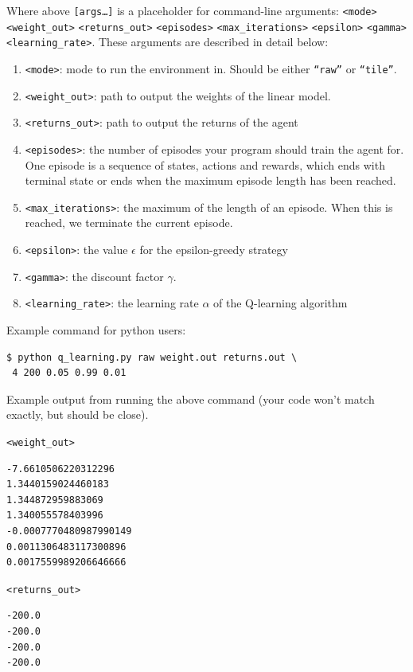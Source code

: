 \documentclass[11pt]{article}
\numberwithin{equation}{section} %
\numberwithin{figure}{section} %
\numberwithin{table}{section} %
\begin{document}
Where above \texttt{[args\dots]} is a placeholder for command-line arguments: \texttt{<mode>} \texttt{<weight\_out>} \texttt{<returns\_out>} \texttt{<episodes>} \texttt{<max\_iterations>} \texttt{<epsilon>} \texttt{<gamma>} \texttt{<learning\_rate>}. These arguments are described in detail below:
\begin{enumerate}
    \item \texttt{<mode>}: mode to run the environment in. Should be either \texttt{``raw''} or \texttt{``tile''}.
    \item \texttt{<weight\_out>}: path to output the weights of the linear model.
    \item \texttt{<returns\_out>}: path to output the returns of the agent
    \item \texttt{<episodes>}: the number of episodes your program should train the agent for. One episode is a sequence of states, actions and rewards, which ends with terminal state or ends when the maximum episode length has been reached.
    \item \texttt{<max\_iterations>}: the maximum of the length of an episode. When this is reached, we terminate the current episode.
    \item \texttt{<epsilon>}: the value $\epsilon$ for the epsilon-greedy strategy
    \item \texttt{<gamma>}: the discount factor $\gamma$.
    \item \texttt{<learning\_rate>}: the learning rate $\alpha$ of the Q-learning algorithm
\end{enumerate}


Example command for python users:
\begin{lstlisting}[language=Shell]
$ python q_learning.py raw weight.out returns.out \ 
 4 200 0.05 0.99 0.01
\end{lstlisting}

Example output from running the above command (your code won't match exactly, but should be close).

\texttt{<weight\_out>}
\begin{lstlisting}
-7.6610506220312296
1.3440159024460183
1.344872959883069
1.340055578403996
-0.0007770480987990149
0.0011306483117300896
0.0017559989206646666
\end{lstlisting}

\texttt{<returns\_out>}
\begin{lstlisting}
-200.0
-200.0
-200.0
-200.0
\end{lstlisting}
\end{document}
